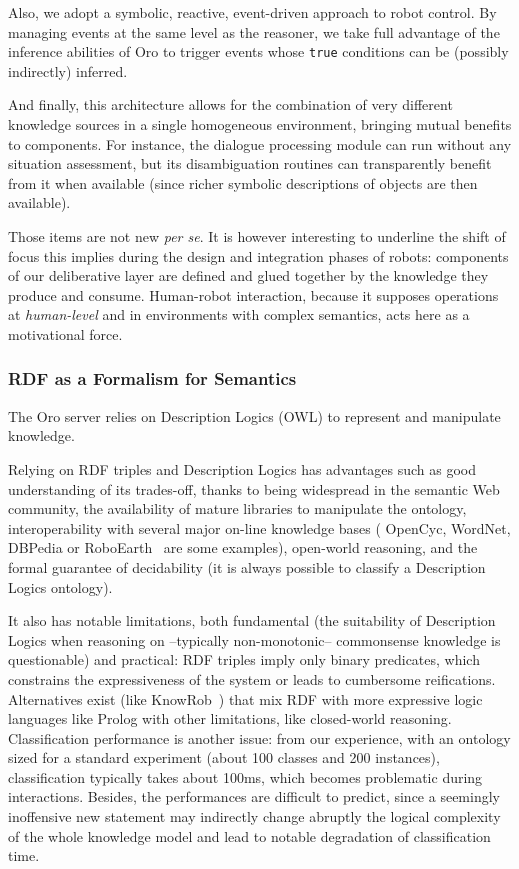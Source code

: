 \documentclass[preprint,3p,times]{elsarticle}
\begin{document}
Also, we adopt a symbolic, reactive, event-driven approach to robot control. By
managing events at the same level as the reasoner, we take full advantage of the
inference abilities of {\sc Oro} to trigger events whose \texttt{true}
conditions can be (possibly indirectly) inferred.

And finally, this architecture allows for the combination of very different
knowledge sources in a single homogeneous environment, bringing mutual
benefits to components. For instance, the dialogue processing module can
run without any situation assessment, but its disambiguation routines
can transparently benefit from it when available (since richer symbolic
descriptions of objects are then available).

Those items are not new \emph{per se}. It is however interesting to underline
the shift of focus this implies during the design and integration phases of
robots: components of our deliberative layer are defined and glued together by
the knowledge they produce and consume. Human-robot interaction, because it
supposes operations at \emph{human-level} and in environments with complex
semantics, acts here as a motivational force.

\subsubsection{RDF as a Formalism for Semantics}

The {\sc Oro} server relies on Description Logics (OWL) to represent and
manipulate knowledge.

Relying on RDF triples and Description Logics has advantages such as good
understanding of its trades-off, thanks to being widespread in the semantic Web
community, the availability of mature libraries to manipulate the ontology,
interoperability with several major on-line knowledge bases ({\sc
OpenCyc}, {\sc WordNet}, {\sc DBPedia} or {\sc RoboEarth}~\cite{Waibel2011} are
some examples), open-world reasoning, and the formal guarantee of decidability
(it is always possible to classify a Description Logics ontology).

It also has notable limitations, both fundamental (the suitability of
Description Logics when reasoning on --typically non-monotonic-- commonsense
knowledge is questionable) and practical: RDF triples imply only binary
predicates, which constrains the expressiveness of the system or leads to
cumbersome reifications. Alternatives exist (like {\sc
KnowRob}~\cite{Tenorth2009a}) that mix RDF with more expressive logic languages
like {\sc Prolog} with other limitations, like closed-world reasoning.
Classification performance is another issue: from our experience, with an
ontology sized for a standard experiment (about 100 classes and 200 instances),
classification typically takes about 100ms, which becomes problematic during
interactions.  Besides, the performances are difficult to predict, since a
seemingly inoffensive new statement may indirectly change abruptly the logical
complexity of the whole knowledge model and lead to notable degradation of
classification time.
\end{document}
